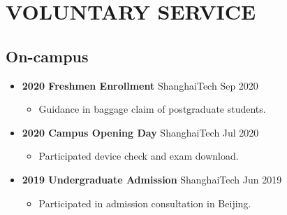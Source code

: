 \documentclass[a4paper,10pt]{ctexart} %
\begin{document}

\section{VOLUNTARY SERVICE}

    \subsection{On-campus}

        \begin{itemize}
            \item \textbf{2020 Freshmen Enrollment} \hfill ShanghaiTech \quad Sep 2020
                \begin{small} \begin{itemize}
                    \item Guidance in baggage claim of postgraduate students.
                \end{itemize} \end{small}
            \item \textbf{2020 Campus Opening Day} \hfill ShanghaiTech \quad Jul 2020
                \begin{small} \begin{itemize}
                    \item Participated device check and exam download.
                \end{itemize} \end{small}
            \item \textbf{2019 Undergraduate Admission} \hfill ShanghaiTech \quad Jun 2019
                \begin{small} \begin{itemize}
                    \item Participated in admission consultation in Beijing.
                \end{itemize} \end{small}
        \end{itemize}
\end{document}
